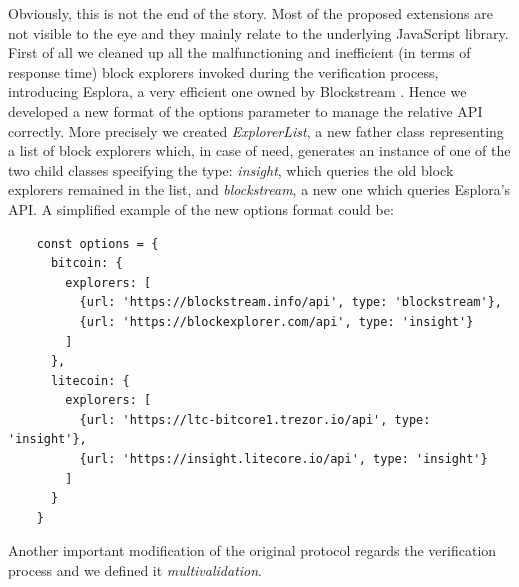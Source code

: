 \bigskip
\noindent
Obviously, this is not the end of the story. Most of the proposed extensions are not visible to the eye and they mainly relate to the underlying JavaScript library. First of all we cleaned up all the malfunctioning and inefficient (in terms of response time) block explorers invoked during the verification process, introducing Esplora, a very efficient one owned by Blockstream \cite{Blockstream}. Hence we developed a new format of the options parameter to manage the relative API correctly. More precisely we created \textit{ExplorerList}, a new father class representing a list of block explorers which, in case of need, generates an instance of one of the two child classes specifying the type: \textit{insight}, which queries the old block explorers remained in the list, and \textit{blockstream}, a new one which queries Esplora's API. A simplified example of the new options format could be:

\begin{lstlisting}
    const options = {
      bitcoin: {
        explorers: [
          {url: 'https://blockstream.info/api', type: 'blockstream'},
          {url: 'https://blockexplorer.com/api', type: 'insight'}
        ]
      },
      litecoin: {
        explorers: [
          {url: 'https://ltc-bitcore1.trezor.io/api', type: 'insight'},
          {url: 'https://insight.litecore.io/api', type: 'insight'}
        ]
      }
    }
\end{lstlisting}

\bigskip
\noindent
Another important modification of the original protocol regards the verification process and we defined it \textit{multivalidation}. 